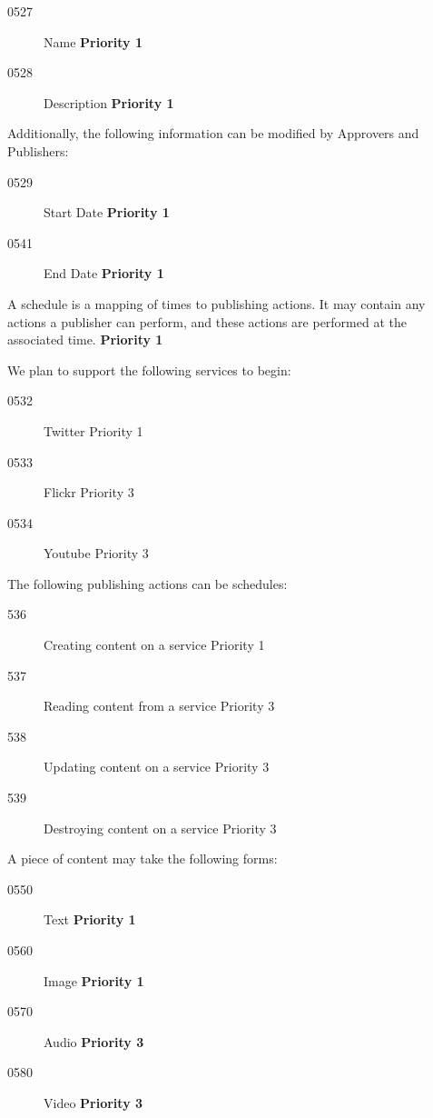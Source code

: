 \documentclass{article}
\begin{document}
\begin{description}
\begin{description}
  \begin{description}
  \item[0527]Name \textbf{Priority 1}
  \item[0528]Description \textbf{Priority 1}
  \end{description}

\item Additionally, the following information can be modified by Approvers
  and Publishers:
  \begin{description}
  \item[0529]Start Date \textbf{Priority 1}
  \item[0541]End Date \textbf{Priority 1}
  \end{description}

\item[0530] A schedule is a mapping of times to publishing actions. It may
  contain any actions a publisher can perform, and these actions are
  performed at the associated time. \textbf{Priority 1}

\item[0531] We plan to support the following services to begin:
  \begin{description}
  \item[0532] Twitter {Priority 1}
  \item[0533] Flickr {Priority 3}
  \item[0534] Youtube {Priority 3}
  \end{description}     

\item[0535] The following publishing actions can be schedules:
  \begin{description}
  \item[536] Creating content on a service {Priority 1}
  \item[537] Reading content from a service {Priority 3}
  \item[538] Updating content on a service {Priority 3}
  \item[539] Destroying content on a service {Priority 3}
  \end{description}

\item[0540] A piece of content may take the following forms:
\begin{description}
\item[0550] Text \textbf{Priority 1}
\item[0560] Image \textbf{Priority 1}
\item[0570] Audio \textbf{Priority 3}
\item[0580] Video \textbf{Priority 3}
\end{description}


\end{description}
\end{description}
\end{document}
